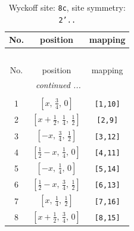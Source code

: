 \documentclass[fleqn,8pt]{jsarticle}
\begin{document}
\begin{longtable}{ccc}
\caption{Wyckoff site: {\tt 8c}, site symmetry: {\tt 2'..}}
 \\
 \hline \hline
No. & position & mapping \\ \hline \endfirsthead

\multicolumn{2}{l}{\tablename\ \thetable{}} \\
 \hline \hline
No. & position & mapping \\ \hline \endhead

 \hline \hline
\multicolumn{2}{r}{\footnotesize\it continued ...} \\ \endfoot

 \hline \hline
\multicolumn{2}{r}{} \\ \endlastfoot

1 & $\left[ x,\, \frac{3}{4},\, 0 \right]$ & {\tt [1,10]} \\ \hline
2 & $\left[ x + \frac{1}{2},\, \frac{1}{4},\, \frac{1}{2} \right]$ & {\tt [2,9]} \\ \hline
3 & $\left[ - x,\, \frac{3}{4},\, \frac{1}{2} \right]$ & {\tt [3,12]} \\ \hline
4 & $\left[ \frac{1}{2} - x,\, \frac{1}{4},\, 0 \right]$ & {\tt [4,11]} \\ \hline
5 & $\left[ - x,\, \frac{1}{4},\, 0 \right]$ & {\tt [5,14]} \\ \hline
6 & $\left[ \frac{1}{2} - x,\, \frac{3}{4},\, \frac{1}{2} \right]$ & {\tt [6,13]} \\ \hline
7 & $\left[ x,\, \frac{1}{4},\, \frac{1}{2} \right]$ & {\tt [7,16]} \\ \hline
8 & $\left[ x + \frac{1}{2},\, \frac{3}{4},\, 0 \right]$ & {\tt [8,15]} \\
\end{longtable}
\renewcommand{\arraystretch}{1.2}
\end{document}
